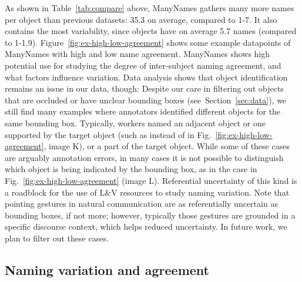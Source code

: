 As shown in Table~\ref{tab:compare} above, ManyNames gathers many more names per object than previous datasets: 35.3 on average, compared to 1-7.
It also contains the most variability, since objects have on average 5.7 names (compared to 1-1.9).
Figure~\ref{fig:ex-high-low-agreement} shows some example datapoints of ManyNames with high and low name agreement.
ManyNames 
shows high potential use for studying the degree of inter-subject naming agreement, and what factors influence variation.
Data analysis shows that object identification remains an issue in our data, though: Despite our care in filtering out objects that are occluded or have unclear bounding boxes (see\ Section~\ref{sec:data}), we still find many examples where annotators identified different objects for the same bounding box. 
Typically, workers named an adjacent object or one supported by the target object (such as  instead of  in Fig.~\ref{fig:ex-high-low-agreement}, image K), or a part of the target object.
While some of these cases are arguably annotation errors, in many cases it is not possible to distinguish which object is being indicated by the bounding box, as in the  case in Fig.~\ref{fig:ex-high-low-agreement} (image L).
Referential uncertainty of this kind is a roadblock for the use of L\&V resources to study naming variation.
Note that pointing gestures in natural communication are as referentially uncertain as bounding boxes, if not more; however, typically those gestures are grounded in a specific discourse context, which helps reduced uncertainty.
In future work, we plan to filter out these cases.

\subsection{Naming variation and agreement}
\label{subsec:counts}

